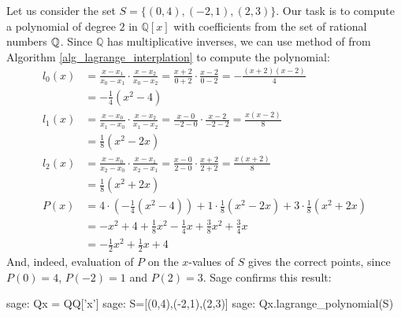\begin{example} Let us consider the set $S=\{(0,4),(-2,1),(2,3)\}$. Our task is to compute a polynomial of degree $2$ in $\mathbb{Q}[x]$ with coefficients from the set of rational numbers $\mathbb{Q}$. Since $\mathbb{Q}$ has multiplicative inverses, we can use method of  from Algorithm  \ref{alg_lagrange_interplation} to compute the polynomial:
\begin{align*}
l_0(x) & = \frac{x-x_1}{x_0-x_1}\cdot\frac{x-x_2}{x_0-x_2}
         = \frac{x+2}{0+2}\cdot\frac{x-2}{0-2}
         =  -\frac{(x+2)(x-2)}{4}\\
       & = -\frac{1}{4}(x^2-4)\\
l_1(x) & = \frac{x-x_0}{x_1-x_0}\cdot\frac{x-x_2}{x_1-x_2}
          = \frac{x-0}{-2-0}\cdot \frac{x-2}{-2-2}
          = \frac{x(x-2)}{8}\\
       & = \frac{1}{8}(x^2-2x)\\
l_2(x) & = \frac{x-x_0}{x_2-x_0}\cdot\frac{x-x_1}{x_2-x_1}
          = \frac{x-0}{2-0}\cdot\frac{x+2}{2+2}
          = \frac{x(x+2)}{8}\\
       & = \frac{1}{8}(x^2+2x)\\
P(x)   & =  4\cdot (-\frac{1}{4}(x^2-4)) + 1\cdot \frac{1}{8}(x^2-2x) + 3\cdot \frac{1}{8}(x^2+2x)\\
       & = -x^2+4 + \frac{1}{8}x^2-\frac{1}{4} x + \frac{3}{8}x^2+\frac{3}{4} x \\
       & = -\frac{1}{2} x^2 +\frac{1}{2} x + 4
\end{align*}
And, indeed, evaluation of $P$ on the $x$-values of $S$ gives the correct points, since $P(0)=4$, $P(-2)=1$ and $P(2)=3$.  Sage confirms this result:
\begin{sagecommandline}
sage: Qx = QQ['x']
sage: S=[(0,4),(-2,1),(2,3)]
sage: Qx.lagrange_polynomial(S)
\end{sagecommandline}
\end{example}
